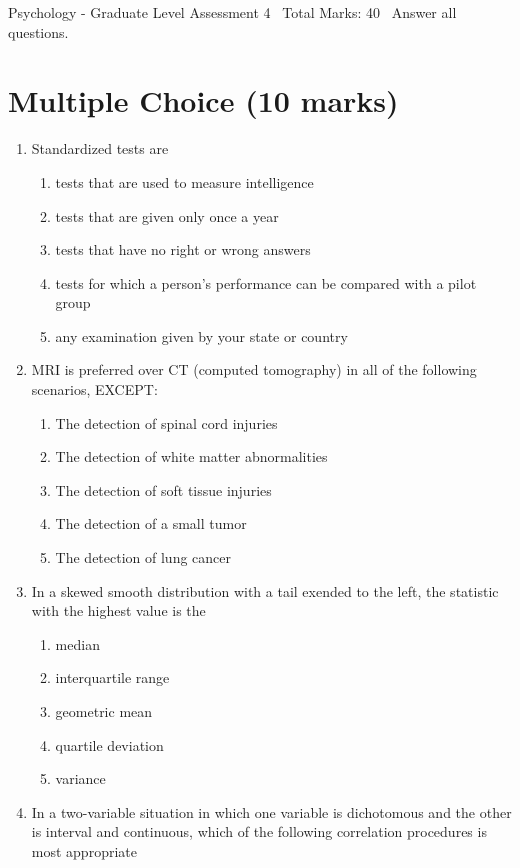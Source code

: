 \documentclass[12pt]{article}
\begin{document}
\begin{center}
Psychology - Graduate Level Assessment 4 \
Total Marks: 40 \
Answer all questions.
\end{center}

\section*{Multiple Choice (10 marks)}
\begin{enumerate}[label=\arabic*.]
\item Standardized tests are
\begin{enumerate}[label=(\alph*)]
    \item tests that are used to measure intelligence
    \item tests that are given only once a year
    \item tests that have no right or wrong answers
    \item tests for which a person's performance can be compared with a pilot group
    \item any examination given by your state or country
\end{enumerate}
\item MRI is preferred over CT (computed tomography) in all of the following scenarios, EXCEPT:
\begin{enumerate}[label=(\alph*)]
    \item The detection of spinal cord injuries
    \item The detection of white matter abnormalities
    \item The detection of soft tissue injuries
    \item The detection of a small tumor
    \item The detection of lung cancer
\end{enumerate}
\item In a skewed smooth distribution with a tail exended to the left, the statistic with the highest value is the
\begin{enumerate}[label=(\alph*)]
    \item median
    \item interquartile range
    \item geometric mean
    \item quartile deviation
    \item variance
\end{enumerate}
\item In a two-variable situation in which one variable is dichotomous and the other is interval and continuous, which of the following correlation procedures is most appropriate

\end{enumerate}
\end{document}
